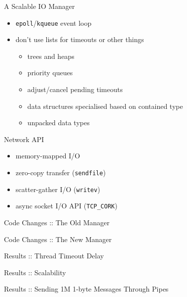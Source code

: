 \documentclass{beamer}
\begin{document}
\begin{frame}{A Scalable IO Manager}
  \begin{itemize}
    \item \texttt{epoll}/\texttt{kqueue} event loop
    \item don't use lists for timeouts or other things
    \begin{itemize}[<+->]
      \item trees and heaps
      \item priority queues
      \item adjust/cancel pending timeouts
      \item data structures specialised based on contained type
      \item unpacked data types
    \end{itemize}
  \end{itemize}
\end{frame}

\begin{frame}{Network API}
  \begin{itemize}
    \item memory-mapped I/O
    \item zero-copy transfer (\texttt{sendfile})
    \item scatter-gather I/O (\texttt{writev})
    \item async socket I/O API (\texttt{TCP\_CORK})
  \end{itemize}
\end{frame}

\begin{frame}{Code Changes :: The Old Manager}
  \centering
\end{frame}

\begin{frame}{Code Changes :: The New Manager}
  \centering
\end{frame}

\begin{frame}{Results :: Thread Timeout Delay}
  \centering
\end{frame}

\begin{frame}{Results :: Scalability}
  \centering
\end{frame}

\begin{frame}{Results :: Sending 1M 1-byte Messages Through Pipes}
  \centering
\end{frame}
\end{document}
